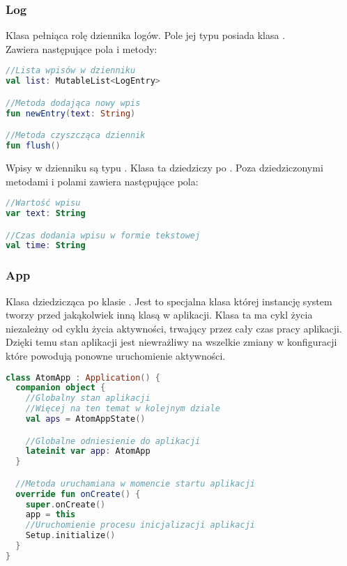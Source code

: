 \subsubsection{Log}
Klasa pełniąca rolę dziennika logów. Pole jej typu posiada klasa .\\
Zawiera następujące pola i metody:

\begin{lstlisting}[language=Kotlin]
//Lista wpisów w dzienniku
val list: MutableList<LogEntry>

//Metoda dodająca nowy wpis
fun newEntry(text: String)

//Metoda czyszcząca dziennik
fun flush()
\end{lstlisting}

Wpisy w dzienniku są typu . Klasa ta dziedziczy po .
Poza dziedziczonymi metodami i polami zawiera następujące pola:

\begin{lstlisting}[language=Kotlin]
//Wartość wpisu
var text: String

//Czas dodania wpisu w formie tekstowej
val time: String
\end{lstlisting}

\newpage

\subsubsection{App}
Klasa dziedzicząca po klasie . Jest to specjalna klasa której instancję system tworzy przed jakąkolwiek inną klasą w aplikacji. Klasa ta ma cykl życia niezależny od cyklu życia aktywności, trwający przez cały czas pracy aplikacji. Dzięki temu stan aplikacji jest niewrażliwy na wszelkie zmiany w konfiguracji które powodują ponowne uruchomienie aktywności.

\begin{lstlisting}[language=Kotlin]
class AtomApp : Application() {
  companion object {
    //Globalny stan aplikacji
    //Więcej na ten temat w kolejnym dziale
    val aps = AtomAppState()

    //Globalne odniesienie do aplikacji
    lateinit var app: AtomApp
  }

  //Metoda uruchamiana w momencie startu aplikacji
  override fun onCreate() {
    super.onCreate()
    app = this
    //Uruchomienie procesu inicjalizacji aplikacji
    Setup.initialize()
  }
}
\end{lstlisting}

